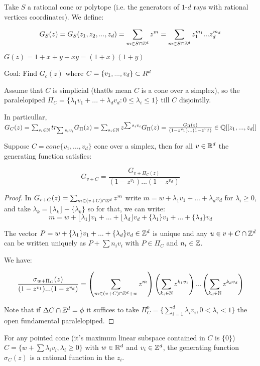 Take $S$ a rational cone or polytope (i.e. the generators of $1$-$d$ rays with rational vertices coordinates). We define:

$$G_S(z)=G_S(z_1,z_2,...,z_d)= \sum _{m \in S \cap \mathbb{Z} ^{d}} z^{m}=\sum _{m \in S \cap \mathbb{Z} ^{d}} z_1^{m_1}...z_d^{m_d}$$

$G(z)=1+x+y+xy=(1+x)(1+y)$

Goal: Find $G_c(z)$ where $ C=\{v_1,...,v_d\} \subset \\R ^{d}$

Assume that $C$ is simplicial (that0s mean $C$ is a cone over a simplex), so the paralelopiped $\Pi_C=\{\lambda_1v_1+...+\lambda_dv_d : 0 \leq \lambda_i \leq 1\}$ till $C$ disjointlly.

In particullar, $G_C(z)= \sum_{s_i \in \mathbb{N}} tr_{\sum s_iv_i}G_{\Pi}(z)=\sum_{s_i \in \mathbb{N}} z^{\sum s_iv_i}G_{\Pi}(z)=\frac{G_{\Pi}(z)}{(1-z^{v_1})...(1-z^{v_d})} \in \mathbb{Q}[[z_1,...,z_d]]$ 

\begin{theorem}
Suppose $C=cone\{v_1,...,v_d\}$ cone over a simplex, then for all $v \in \mathbb{R}^{d}$ the generating function satisfies:

$$G_{v+C}=\frac{G_{v+\Pi_C(z)}}{(1-z^{v_1})...(1-z^{v_d})}$$
\end{theorem}

\begin{proof}
In $G_{v+C}(z)=\sum_{m \in (v+C) \cap \mathbb{Z} ^{d}} z^{m}$ write $m=w+\lambda_1v_1+...+\lambda_dv_d$ for $\lambda_i \geq 0$, and take $\lambda_k= \lfloor \lambda_k \rfloor+\lbrace \lambda_k \rbrace$ so for that, we can write:
$$m=w+\lfloor \lambda_1 \rfloor v_1+...+\lfloor \lambda_d \rfloor v_d+\lbrace\lambda_1 \rbrace v_1+...+\lbrace\lambda_d \rbrace v_d$$

The vector $P=w+\lbrace\lambda_1 \rbrace v_1+...+\lbrace\lambda_d \rbrace v_d \in \mathbb{Z}^{d}$ is unique and any $u \in v+C\cap \mathbb{Z}^{d}$ can be written uniquely as $P+\sum n_i v_i$ with $P\in \Pi_C$ and $n_i \in \mathbb{Z}$.

We have:

$$\frac{\sigma_{w+\Pi_C}(z)}{(1-z^{v_1})...(1-z^{v_d})}=\left(\sum_{m \in (v+C) \cap \mathbb{Z} ^{d}+w} z^{m}\right)\left(\sum_{k_i \in \mathbb{N}} z^{k_1 v_1}\right)...\left(\sum_{k_d \in \mathbb{N}} z^{k_d v_d}\right)$$

Note that if $\Delta C \cap \mathbb{Z}^{d}=\phi$ it suffices to take $\Pi_C^{0}=\{\sum_{i=1}^{d} \lambda_i v_i, 0<\lambda_i<1\}$ the open fundamental paralelopiped.
\end{proof}

\begin{theorem}
For any pointed cone (it's maximum linear subspace contained in $C$ is $\{ 0 \}$) $C=\{w+\sum \lambda_i v_i, \lambda_i \geq 0 \}$ with $w \in \mathbb{R}^{d}$ and $v_i \in \mathbb{Z}^{d}$, the generating function $\sigma_C (z)$ is a rational function in the $z_i$.
\end{theorem}